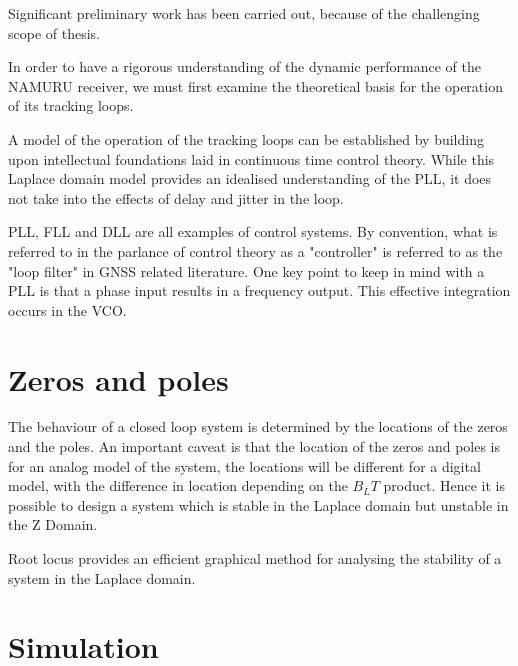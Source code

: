 Significant preliminary work has been carried out, because of the challenging scope of thesis. 

In order to have a rigorous understanding of the dynamic performance of the \ac{NAMURU} receiver, we must first examine the theoretical basis for the operation of its tracking loops. 

A model of the operation of the tracking loops can be established by building upon intellectual foundations laid in continuous time control theory. While this Laplace domain model provides an idealised understanding of the \ac{PLL}, it does not take into the effects of delay and jitter in the loop. 

\ac{PLL}, \ac{FLL} and \ac{DLL} are all examples of control systems. By convention, what is referred to in the parlance of control theory as a "controller" is referred to as the "loop filter" in \ac{GNSS} related literature. One key point to keep in mind with a \ac{PLL} is that a phase input results in a frequency output. This effective integration occurs in the \ac{VCO}.

\section{Zeros and poles}
The behaviour of a closed loop system is determined by the locations of the zeros and the poles. An important caveat is that the location of the zeros and poles is for an analog model of the system, the locations will be different for a digital model, with the difference in location depending on the $B_LT$ product.  Hence it is possible to design a system which is stable in the Laplace domain but unstable in the Z Domain. 

Root locus provides an efficient graphical method for analysing the stability of a system in the Laplace domain\cite{Nise}. 


\begin{comment}
\begin{lstlisting}[frame=single]
Kvco =1;
Bn = 18;
a3 = 1.1;
b3 = 2.4;
omega = Bn/0.7845;
k1 = b3*omega;
k2 = a3*(omega^2);
k3 = omega^3;
%H is the forward transfer function
H = tf([Kvco*k1 Kvco*k2 Kvco*k3],[1 0 0 0]);
rlocus(H);
\end{lstlisting}
\end{comment}

\section{Simulation}

